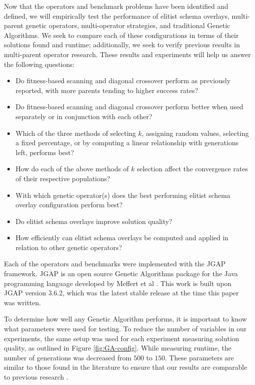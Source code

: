 Now that the operators and benchmark problems have been identified and defined, we will empirically test the performance of elitist schema overlays, multi-parent genetic operators, multi-operator strategies, and traditional Genetic Algorithms. We seek to compare each of these configurations in terms of their solutions found and runtime; additionally, we seek to verify previous results in multi-parent operator research. These results and experiments will help us answer the following questions:

\begin{itemize}
\item Do fitness-based scanning and diagonal crossover perform as previously reported, with more parents tending to higher success rates?
\item Do fitness-based scanning and diagonal crossover perform better when used separately or in conjunction with each other? 
\item Which of the three methods of selecting $k$, assigning random values, selecting a fixed percentage, or by computing a linear relationship with generations left, performs best?
\item How do each of the above methods of $k$ selection affect the convergence rates of their respective populations?
\item With which genetic operator(s) does the best performing elitist schema overlay configuration perform best?
\item Do elitist schema overlays improve solution quality?
\item How efficiently can elitist schema overlays be computed and applied in relation to other genetic operators?
\end{itemize}

Each of the operators and benchmarks were implemented with the JGAP framework. JGAP is an open source Genetic Algorithms package for the Java programming language developed by Meffert et al \cite{jgap}. This work is built upon JGAP version 3.6.2, which was the latest stable release at the time this paper was written.

To determine how well any Genetic Algorithm performs, it is important to know what parameters were used for testing. To reduce the number of variables in our experiments, the same setup was used for each experiment measuring solution quality, as outlined in Figure \ref{fig:GA-config}. While measuring runtime, the number of generations was decreased from $500$ to $150$. These parameters are similar to those found in the literature to ensure that our results are comparable to previous research \cite{Sudholt12, Eiben95, Eiben96}. 

